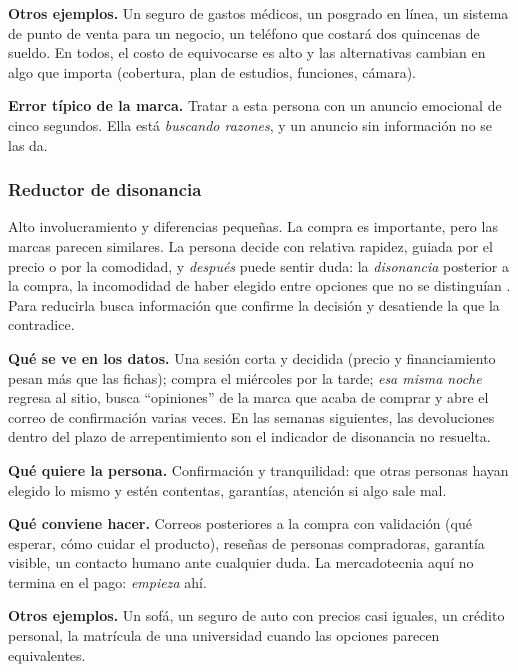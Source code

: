 \textbf{Otros ejemplos.} Un seguro de gastos médicos, un posgrado en línea, un
sistema de punto de venta para un negocio, un teléfono que costará dos
quincenas de sueldo. En todos, el costo de equivocarse es alto y las alternativas
cambian en algo que importa (cobertura, plan de estudios, funciones, cámara).

\textbf{Error típico de la marca.} Tratar a esta persona con un anuncio
emocional de cinco segundos. Ella está \emph{buscando razones}, y un anuncio sin
información no se las da.

\subsubsection{Reductor de disonancia}
\label{sec:cap09-disonancia}

Alto involucramiento y diferencias pequeñas. La compra es importante, pero las
marcas parecen similares. La persona decide con relativa rapidez, guiada por
el precio o por la comodidad, y \emph{después} puede sentir duda: la
\emph{disonancia} posterior a la compra, la incomodidad de haber elegido entre
opciones que no se distinguían \parencite{assael1987}. Para reducirla busca
información que confirme la decisión y desatiende la que la contradice.

\begin{cajaEjemplo}[title={Ejemplo digital: el colchón de Camila}]
\textbf{Qué se ve en los datos.} Una sesión corta y decidida (precio y
financiamiento pesan más que las fichas); compra el miércoles por la tarde;
\emph{esa misma noche} regresa al sitio, busca \enquote{opiniones} de la marca que
acaba de comprar y abre el correo de confirmación varias veces. En las semanas
siguientes, las devoluciones dentro del plazo de arrepentimiento son el
indicador de disonancia no resuelta.

\textbf{Qué quiere la persona.} Confirmación y tranquilidad: que otras personas
hayan elegido lo mismo y estén contentas, garantías, atención si algo sale
mal.

\textbf{Qué conviene hacer.} Correos posteriores a la compra con
validación (qué esperar, cómo cuidar el producto), reseñas de personas
compradoras, garantía visible, un contacto humano ante cualquier duda. La
mercadotecnia aquí no termina en el pago: \emph{empieza} ahí.
\end{cajaEjemplo}

\textbf{Otros ejemplos.} Un sofá, un seguro de auto con precios casi iguales, un
crédito personal, la matrícula de una universidad cuando las opciones parecen
equivalentes.

